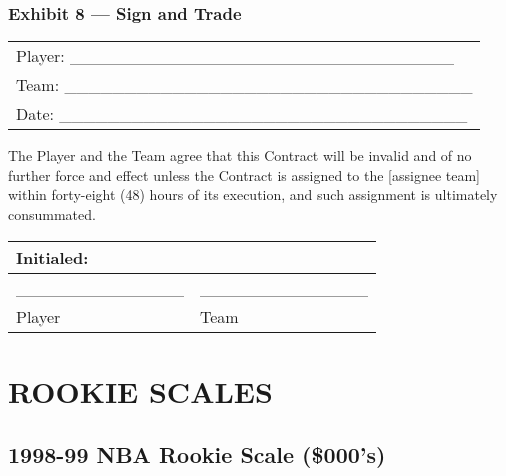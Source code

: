 \documentclass[
]{book}
\begin{document}
\newpage

\hypertarget{exhibit-8-sign-and-trade}{%
\subsection{Exhibit 8 --- Sign and Trade}\label{exhibit-8-sign-and-trade}}

\begin{longtable}[]{@{}l@{}}
\toprule()
\endhead
Player: \_\_\_\_\_\_\_\_\_\_\_\_\_\_\_\_\_\_\_\_\_\_\_\_\_\_\_\_\_\_\_\_ \\
Team: \_\_\_\_\_\_\_\_\_\_\_\_\_\_\_\_\_\_\_\_\_\_\_\_\_\_\_\_\_\_\_\_\_\_ \\
Date: \_\_\_\_\_\_\_\_\_\_\_\_\_\_\_\_\_\_\_\_\_\_\_\_\_\_\_\_\_\_\_\_\_\_ \\
\bottomrule()
\end{longtable}

The Player and the Team agree that this Contract will be invalid and of no further force and effect unless the Contract is assigned to the {[}assignee team{]} within forty-eight (48) hours of its execution, and such assignment is ultimately consummated.

\begin{longtable}[]{@{}ll@{}}
\toprule()
Initialed: & \\
\midrule()
\endhead
\_\_\_\_\_\_\_\_\_\_\_\_\_\_ & \_\_\_\_\_\_\_\_\_\_\_\_\_\_ \\
Player & Team \\
\bottomrule()
\end{longtable}

\hypertarget{rookie-scales}{%
\chapter{ROOKIE SCALES}\label{rookie-scales}}

\hypertarget{nba-rookie-scale-000s}{%
\section{1998-99 NBA Rookie Scale (\$000's)}\label{nba-rookie-scale-000s}}
\end{document}
